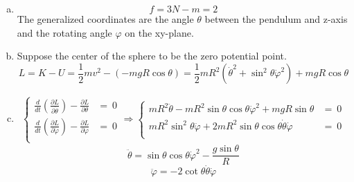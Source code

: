 \documentclass{article}
\begin{document}
\section{}
\begin{enumerate}[(a)]
	\item
	$$f=3N-m=2$$
	The generalized coordinates are the angle $\theta$ between the pendulum and z-axis and the rotating angle $\varphi$ on the xy-plane.
	\item
	Suppose the center of the sphere to be the zero potential point.
	$$L=K-U=\frac{1}{2}mv^2-(-mgR\cos\theta)=\frac{1}{2}mR^2(\dot{\theta}^2+\sin^2\theta\dot{\varphi}^2)+mgR\cos\theta$$
	\item
	\begin{eqnarray*}
	\left\{
		\begin{array}{ll}
		\frac{d}{dt}\left(\frac{\partial L}{\partial\dot{\theta}}\right)-\frac{\partial L}{\partial\theta}&=\ 0\\
		\frac{d}{dt}\left(\frac{\partial L}{\partial\dot{\varphi}}\right)-\frac{\partial L}{\partial\varphi}&=\ 0\\
		\end{array}
	\right.\Longrightarrow\left\{
		\begin{array}{ll}
		mR^2\ddot{\theta}-mR^2\sin\theta\cos\theta\dot{\varphi}^2+mgR\sin\theta&=\ 0\\
		mR^2\sin^2\theta\ddot{\varphi}+2mR^2\sin\theta\cos\theta\dot{\theta}\dot{\varphi}&=\ 0\\
		\end{array}
	\right.
	\end{eqnarray*}
	$$\ddot{\theta}=\sin\theta\cos\theta\dot{\varphi}^2-\frac{g\sin\theta}{R}$$
	$$\ddot{\varphi}=-2\cot\theta\dot{\theta}\dot{\varphi}$$
\end{enumerate}
\end{document}
